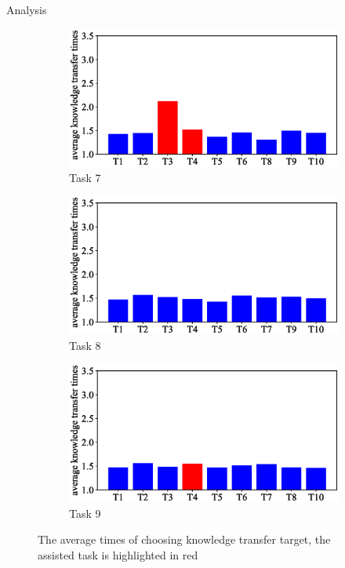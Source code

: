 \begin{frame}{Analysis}
\begin{figure}
        \begin{subfigure}[b]{0.27\linewidth}
            \includegraphics[width=\textwidth]{figure/count/7.eps}
            \caption{Task 7}
        \end{subfigure}
        \begin{subfigure}[b]{0.27\linewidth}
            \includegraphics[width=\textwidth]{figure/count/8.eps}
            \caption{Task 8}
        \end{subfigure}
        \begin{subfigure}[b]{0.27\linewidth}
            \includegraphics[width=\textwidth]{figure/count/9.eps}
            \caption{Task 9}
        \end{subfigure}

        \caption{The average times of choosing knowledge transfer target, the assisted task is highlighted in red}
    \end{figure}
\end{frame}

